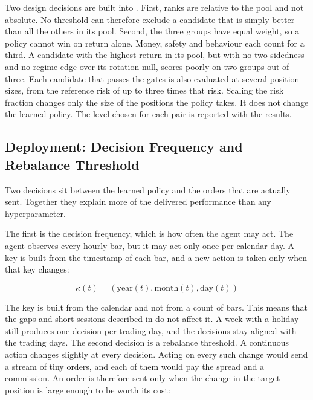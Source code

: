 

Two design decisions are built into . First, ranks are relative to the pool and not absolute. No threshold can therefore exclude a candidate that is simply better than all the others in its pool. Second, the three groups have equal weight, so a policy cannot win on return alone. Money, safety and behaviour each count for a third. A candidate with the highest return in its pool, but with no two-sidedness and no regime edge over its rotation null, scores poorly on two groups out of three. Each candidate that passes the gates is also evaluated at several position sizes, from the reference risk of  up to three times that risk. Scaling the risk fraction changes only the size of the positions the policy takes. It does not change the learned policy. The level chosen for each pair is reported with the results.

\subsection{Deployment: Decision Frequency and Rebalance Threshold}

Two decisions sit between the learned policy and the orders that are actually sent. Together they explain more of the delivered performance than any hyperparameter.

The first is the decision frequency, which is how often the agent may act. The agent observes every hourly bar, but it may act only once per calendar day. A key is built from the timestamp of each bar, and a new action is taken only when that key changes:

\begin{equation}
\kappa(t) = (\text{year}(t), \text{month}(t), \text{day}(t))
\label{Equation:DecisionKey}
\end{equation}

The key is built from the calendar and not from a count of bars. This means that the gaps and short sessions described in  do not affect it. A week with a holiday still produces one decision per trading day, and the decisions stay aligned with the trading days. The second decision is a rebalance threshold. A continuous action changes slightly at every decision. Acting on every such change would send a stream of tiny orders, and each of them would pay the spread and a commission. An order is therefore sent only when the change in the target position is large enough to be worth its cost:

